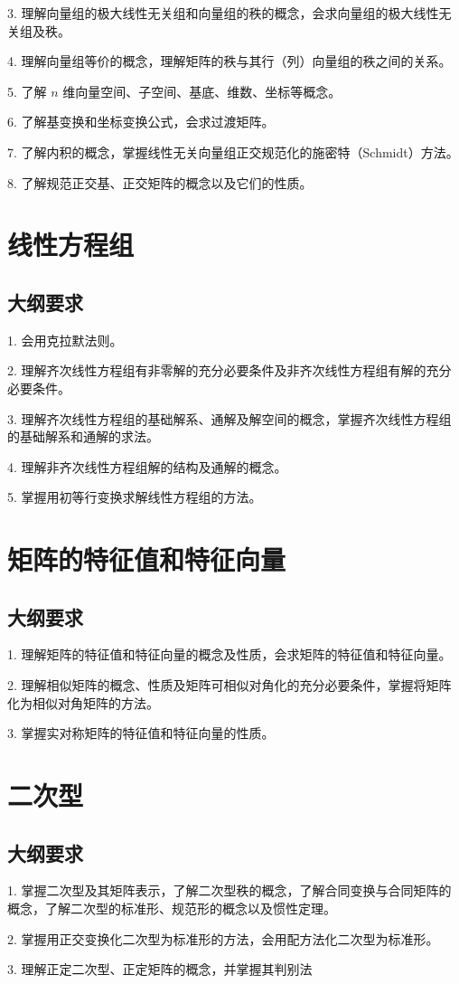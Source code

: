 3. 理解向量组的极大线性无关组和向量组的秩的概念，会求向量组的极大线性无关组及秩。

4. 理解向量组等价的概念，理解矩阵的秩与其行（列）向量组的秩之间的关系。

5. 了解 $n$ 维向量空间、子空间、基底、维数、坐标等概念。

6. 了解基变换和坐标变换公式，会求过渡矩阵。

7. 了解内积的概念，掌握线性无关向量组正交规范化的施密特（Schmidt）方法。

8. 了解规范正交基、正交矩阵的概念以及它们的性质。


\section{线性方程组}

\subsection{大纲要求}

1. 会用克拉默法则。

2. 理解齐次线性方程组有非零解的充分必要条件及非齐次线性方程组有解的充分必要条件。

3. 理解齐次线性方程组的基础解系、通解及解空间的概念，掌握齐次线性方程组的基础解系和通解的求法。

4. 理解非齐次线性方程组解的结构及通解的概念。

5. 掌握用初等行变换求解线性方程组的方法。


\section{矩阵的特征值和特征向量}

\subsection{大纲要求}

1. 理解矩阵的特征值和特征向量的概念及性质，会求矩阵的特征值和特征向量。

2. 理解相似矩阵的概念、性质及矩阵可相似对角化的充分必要条件，掌握将矩阵化为相似对角矩阵的方法。

3. 掌握实对称矩阵的特征值和特征向量的性质。


\section{二次型}

\subsection{大纲要求}

1. 掌握二次型及其矩阵表示，了解二次型秩的概念，了解合同变换与合同矩阵的概念，了解二次型的标准形、规范形的概念以及惯性定理。

2. 掌握用正交变换化二次型为标准形的方法，会用配方法化二次型为标准形。

3. 理解正定二次型、正定矩阵的概念，并掌握其判别法
